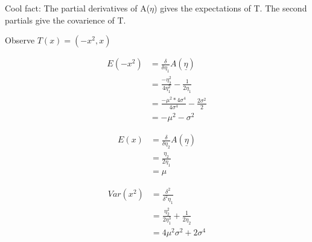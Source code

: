\documentclass[11pt,fleqn]{book} %
\begin{document}
	Cool fact: The partial derivatives of A($\eta$) gives the expectations of T. The second partials give the covarience of T.

	Observe $T(x)=(-x^2,x)$

		\begin{align*}
			E(-x^2) &= \frac{\delta}{\delta\eta_1}A(\underline\eta)\\
				&= \frac{-\eta_2^2}{4\eta_1^2}-\frac{1}{2\eta_1}\\
				&= \frac{-\mu^2 * 4\sigma^4}{4 \sigma^4} - \frac{2\sigma^2}{2} \\
				&=-\mu^2-\sigma^2
		\end{align*}

		\begin{align*}
			E(x) &= \frac{\delta}{\delta\eta_2}A(\underline{\eta})\\
				&= \frac{\eta_2}{2\eta_1}\\
				&= \mu
		\end{align*}

		\begin{align*}
			Var(x^2) &= \frac{\delta^2}{\delta^2 \eta_1}\\
				&= \frac{\eta_2^2}{2\eta^3_1}+\frac{1}{2\eta_2}\\
				&= 4\mu^2\sigma^2+2\sigma^4
		\end{align*}
\end{document}

